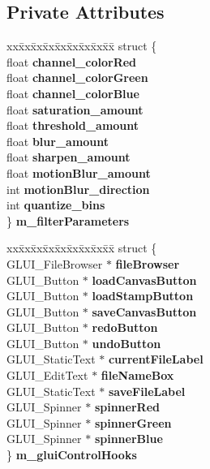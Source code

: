 \subsection*{Private Attributes}
\begin{DoxyCompactItemize}
\item 
\begin{tabbing}
xx\=xx\=xx\=xx\=xx\=xx\=xx\=xx\=xx\=\kill
struct \{\\
\>float {\bfseries channel\_colorRed}\\
\>float {\bfseries channel\_colorGreen}\\
\>float {\bfseries channel\_colorBlue}\\
\>float {\bfseries saturation\_amount}\\
\>float {\bfseries threshold\_amount}\\
\>float {\bfseries blur\_amount}\\
\>float {\bfseries sharpen\_amount}\\
\>float {\bfseries motionBlur\_amount}\\
\>int {\bfseries motionBlur\_direction}\\
\>int {\bfseries quantize\_bins}\\
\} {\bfseries m\_filterParameters}\hypertarget{classFlashPhotoApp_adc1082b61b8e0650f8dba72e0ac9c90d}{}\label{classFlashPhotoApp_adc1082b61b8e0650f8dba72e0ac9c90d}
\\

\end{tabbing}\item 
\begin{tabbing}
xx\=xx\=xx\=xx\=xx\=xx\=xx\=xx\=xx\=\kill
struct \{\\
\>GLUI\_FileBrowser $\ast$ {\bfseries fileBrowser}\\
\>GLUI\_Button $\ast$ {\bfseries loadCanvasButton}\\
\>GLUI\_Button $\ast$ {\bfseries loadStampButton}\\
\>GLUI\_Button $\ast$ {\bfseries saveCanvasButton}\\
\>GLUI\_Button $\ast$ {\bfseries redoButton}\\
\>GLUI\_Button $\ast$ {\bfseries undoButton}\\
\>GLUI\_StaticText $\ast$ {\bfseries currentFileLabel}\\
\>GLUI\_EditText $\ast$ {\bfseries fileNameBox}\\
\>GLUI\_StaticText $\ast$ {\bfseries saveFileLabel}\\
\>GLUI\_Spinner $\ast$ {\bfseries spinnerRed}\\
\>GLUI\_Spinner $\ast$ {\bfseries spinnerGreen}\\
\>GLUI\_Spinner $\ast$ {\bfseries spinnerBlue}\\
\} {\bfseries m\_gluiControlHooks}\hypertarget{classFlashPhotoApp_a26ed03c8eea24f9b2193fe98f02a78b7}{}\label{classFlashPhotoApp_a26ed03c8eea24f9b2193fe98f02a78b7}
\\


\end{tabbing}
\end{DoxyCompactItemize}
